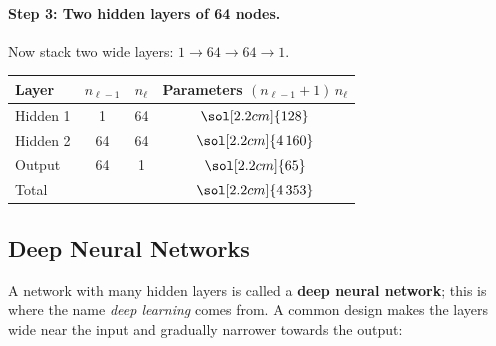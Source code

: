\documentclass[12pt, a4paper]{article}
\begin{document}

\paragraph{Step 3: Two hidden layers of 64 nodes.}
Now stack two wide layers: $1 \to 64 \to 64 \to 1$.

\begin{center}
  \renewcommand{\arraystretch}{1.3}
  \begin{tabular}{lccc}
    \toprule
    Layer                     & $n_{\ell-1}$          & $n_\ell$ & Parameters $(n_{\ell-1}+1)\,n_\ell$ \\
    \midrule
    Hidden 1                  & 1                     & 64       & $\sol[2.2cm]{128}$                  \\
    Hidden 2                  & 64                    & 64       & $\sol[2.2cm]{4\,160}$               \\
    Output                    & 64                    & 1        & $\sol[2.2cm]{65}$                   \\
    \midrule
    \multicolumn{3}{l}{Total} & $\sol[2.2cm]{4\,353}$                                                  \\
    \bottomrule
  \end{tabular}
\end{center}


\subsection{Deep Neural Networks}

A network with many hidden layers is called a \textbf{deep neural network};
this is where the name \emph{deep learning} comes from. A common design makes
the layers wide near the input and gradually narrower towards the output:
\end{document}

